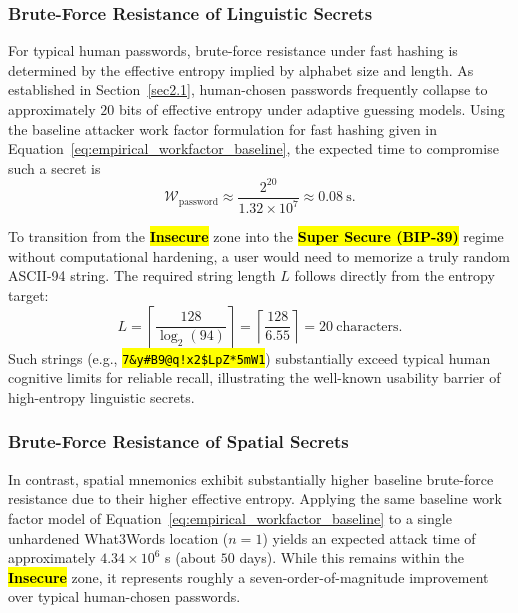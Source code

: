 \documentclass[mathematics,article,accept,pdftex,moreauthors]{Definitions/mdpi}
\begin{document}
\subsubsection{Brute-Force Resistance of Linguistic Secrets}

For typical human passwords, brute-force resistance under fast hashing is determined by the effective entropy implied by alphabet size and length. As established in Section~\ref{sec2.1}, human-chosen passwords frequently collapse to approximately $20$ bits of effective entropy under adaptive guessing models. Using the baseline attacker work factor formulation for fast hashing given in Equation~\eqref{eq:empirical_workfactor_baseline}, the expected time to compromise such a secret is
\begin{equation}
\mathcal{W}_{\text{password}} \approx \frac{2^{20}}{1.32 \times 10^7} \approx 0.08 \ \text{s}.
\end{equation}

To transition from the \textbf{\hl{Insecure}} zone into the \textbf{\hl{Super Secure (BIP-39)}} regime without computational hardening, a user would need to memorize a truly random ASCII-94 string. The required string length $L$ follows directly from the entropy target:
\begin{equation}
L = \left\lceil \frac{128}{\log_2(94)} \right\rceil = \left\lceil \frac{128}{6.55} \right\rceil = 20 \ \text{characters}.
\end{equation}
Such strings (e.g., \texttt{\hl{7\&y\#B9@q!x2\$LpZ*5mW1}}) %
substantially exceed typical human cognitive limits for reliable recall, illustrating the well-known usability barrier of high-entropy linguistic secrets.

\subsubsection{Brute-Force Resistance of Spatial Secrets}

In contrast, spatial mnemonics exhibit substantially higher baseline brute-force resistance due to their higher effective entropy. Applying the same baseline work factor model of Equation~\eqref{eq:empirical_workfactor_baseline} to a single unhardened What3Words location ($n=1$) yields an expected attack time of approximately $4.34 \times 10^{6}$ s (about $50$ days). While this remains within the \textbf{\hl{Insecure}} zone, it represents roughly a seven-order-of-magnitude improvement over typical human-chosen passwords.
\end{document}
